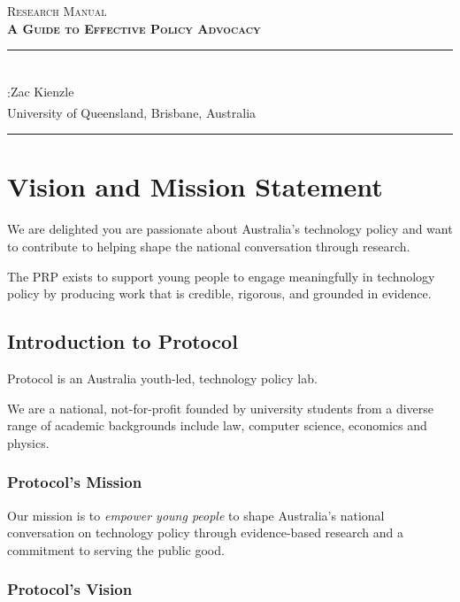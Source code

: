 \documentclass[12pt, a4paper]{article}
\begin{document}
\begin{titlepage}
	\colorbox{black!5}{%
		\parbox[t]{0.975\textwidth}{%
			\parbox[t]{0.95\textwidth}{%
				\raggedleft\vspace{0.75cm}\Huge\scshape
				Research Manual \\[7.5pt]
				\large\bfseries A Guide to Effective Policy Advocacy
				\vspace{0.75cm}
			}
		}
	}
	\vfill
	\parbox[t]{0.95\textwidth}{%
		\hfill\rule{0.15\linewidth}{0.5pt}\\[7.5pt]
		\raggedleft{}
		\textcopyright:{Zac Kienzle\textsuperscript{\textdagger}}\\[4pt]
		\normalsize\textsuperscript{\textdagger} University of Queensland, Brisbane, Australia\\
		\hfill\rule{0.15\linewidth}{0.5pt}
	}
\end{titlepage}

\tableofcontents

\section{Vision and Mission Statement}
We are delighted you are passionate about Australia's technology policy and want to contribute to helping shape the national conversation through research.

The PRP exists to support young people to engage meaningfully in technology policy by producing work that is credible, rigorous, and grounded in evidence.

\subsection{Introduction to Protocol}
Protocol is an Australia youth-led, technology policy lab.

We are a national, not-for-profit founded by university students from a diverse range of academic backgrounds include law, computer science, economics and physics.

\subsubsection{Protocol's Mission}
Our mission is to \emph{empower young people} to shape Australia's national conversation on technology policy through evidence-based research and a commitment to serving the public good.

\subsubsection{Protocol's Vision}
\end{document}

